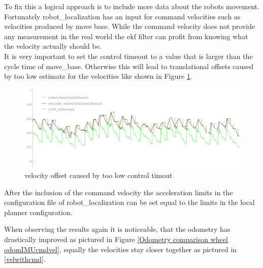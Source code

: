 To fix this a logical approach is to include more data about the robots movement. Fortunately robot\_localization has an input for command velocities such as velocities produced by move base. While the command velocity does not provide any measurement in the real world the ekf filter can profit from knowing what the velocity actually should be.\\
It is very important to set the control timeout to a value that is larger than the cycle time of move\_base. Otherwise this will lead to translational offsets caused by too low estimate for the velocities like shown in Figure \ref{velocity offset}.

\begin{figure}[H]
	\includegraphics[width=\textwidth]{Pictures/velocity comp}
	\caption{velocity offset caused by too low control timout}
	\label{velocity offset}

\end{figure}

After the inclusion of the command velocity the acceleration limits in the configuration file of robot\_localization can be set equal to the limits in the local planner configuration.

When observing the results again it is noticeable, that the odometry has drastically improved as pictured in Figure \ref{Odometry comparison wheel odomIMUcmdvel}, equally the velocities stay closer together as pictured in \ref{velwithcmd}.

